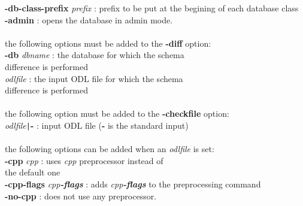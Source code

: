\begin{tabbing}
{\bf -db-class-prefix} \emph{prefix}    \>: prefix to be put at the begining of each database class\\
{\bf -admin}                       \>: opens the database in admin mode.\\
\\
the following options must be added to the {\bf -diff} option:\\
{\bf -db} \emph{dbname}                 \>: the database for which the schema\\
                             \>\>  difference is performed\\
\emph{odlfile}                    \>: the input ODL file for which the schema\\
                               difference is performed\\
\\
the following option must be added to the {\bf -checkfile} option:\\
\emph{odlfile}\texttt{|}{\bf -}                  \>: input ODL file ({\bf -} is the standard input)\\
\\
the following options can be added when an \emph{odlfile} is set:\\
{\bf -cpp} \emph{cpp}                   \>: uses \emph{cpp} preprocessor instead of\\
                             \>\> the default one\\
{\bf -cpp-flags} \emph{cpp{\bf -flags}}       \>: adds \emph{cpp{\bf -flags}} to the preprocessing command\\
{\bf -no-cpp}                      \>: does not use any preprocessor.
\end{tabbing}



